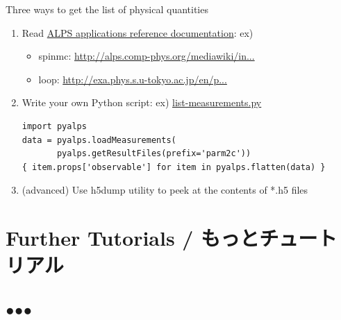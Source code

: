 \begin{frame}[t,fragile]{Three ways to get the list of physical quantities}
  \begin{enumerate}
    \setlength{\itemsep}{1em}
  \item Read \href{http://alps.comp-phys.org/mediawiki/index.php/ALPS_2_Documentation:Overview}{ALPS applications reference documentation}: ex)
    \begin{itemize}
    \item spinmc: {\footnotesize \href{http://alps.comp-phys.org/mediawiki/index.php/Documentation:ClassicalMCSimulations}{http://alps.comp-phys.org/mediawiki/in...}}
    \item loop: {\footnotesize \href{http://exa.phys.s.u-tokyo.ac.jp/en/projects/alps-looper}{http://exa.phys.s.u-tokyo.ac.jp/en/p...}}
    \end{itemize}
  \item Write your own Python script: ex) \href{https://gist.github.com/wistaria/71cb8d7a22f45bfe256d}{list-measurements.py}
\begin{lstlisting}
import pyalps
data = pyalps.loadMeasurements(
       pyalps.getResultFiles(prefix='parm2c'))
{ item.props['observable'] for item in pyalps.flatten(data) }
\end{lstlisting}
  \item (advanced) Use h5dump utility to peek at the contents of *.h5 files
  \end{enumerate}
\end{frame}

\section{Further Tutorials / もっとチュートリアル}
\subsection*{{\protect\color{red}●}{\protect\color{blue}●}{\protect\color{green}●}}

